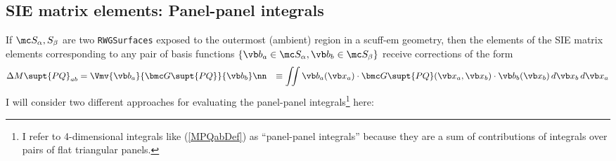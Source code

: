 \documentclass[letterpaper]{article}
\begin{document}
\subsection{SIE matrix elements: Panel-panel integrals}

If $\mc S_\alpha, S_\beta$ are two \texttt{RWGSurfaces} 
exposed to the outermost (ambient) region in a {\sc scuff-em}
geometry, then the elements of the SIE matrix elements corresponding
to any pair of basis functions
$\{\vb b_a\in \mc S_\alpha, \vb b_b\in \mc S_\beta\}$ receive
corrections of the form
\begin{align}
   \Delta M\supt{PQ}_{ab}
 &=\Vmv{\vb b_a}{\bmc G\supt{PQ}}{\vb b_b}
\nn
&\equiv \iint
    \vb    b_a(\vb x_a)
    \cdot \bmc G\supt{PQ}(\vb x_a, \vb x_b)
    \cdot \vb b_b(\vb x_b)
    \,d\vb x_b 
    \,d\vb x_a 
\label{MPQabDef}
\end{align}
I will consider two different approaches for evaluating the
panel-panel integrals\footnote{I refer to 4-dimensional
integrals like (\ref{MPQabDef}) as ``panel-panel integrals'' because
they are a sum of contributions of integrals over pairs of flat
triangular panels.} here:
\end{document}
